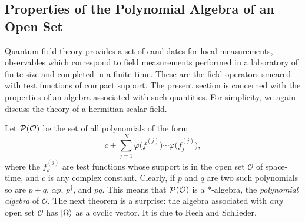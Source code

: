 \subsection{Properties of the Polynomial Algebra of an Open Set}
\label{sec:ch4-2-polynomial-algebra}

Quantum field theory provides a set of candidates for local measurements,
observables which correspond to field measurements performed in a laboratory
of finite size and completed in a finite time. These are the field operators
smeared with test functions of compact support. The present section is
concerned with the properties of an algebra associated with such quantities.
For simplicity, we again discuss the theory of a hermitian scalar field.

Let $\mathcal{P}(\mathcal O)$ be the set of all polynomials of the form
\begin{equation}
  c+\sum_{j=1}^{N}
  \varphi\bigl(f_1^{(j)}\bigr)\cdots
  \varphi\bigl(f_j^{(j)}\bigr),
  \tag{4-9}\label{eq:ch4-9}
\end{equation}
where the $f_k^{(j)}$ are test functions whose support is in the open set
$\mathcal O$ of space-time, and $c$ is any complex constant. Clearly, if $p$
and $q$ are two such polynomials so are $p+q$, $\alpha p$, $p^\dagger$, and
$pq$. This means that $\mathcal{P}(\mathcal O)$ is a $*$-algebra, the
\emph{polynomial algebra} of $\mathcal O$. The next theorem is a surprise:
the algebra associated with \emph{any} open set $\mathcal O$ has
$\lvert \Omega\rangle$ as a cyclic vector. It is due to Reeh and Schlieder.

